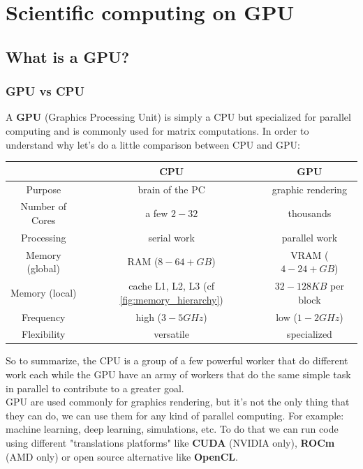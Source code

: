 \documentclass[12pt, openany]{report}
\theoremstyle{definition}
\begin{document}
\chapter{Scientific computing on GPU}
\section{What is a GPU?}
\subsection{GPU vs CPU}
A \textbf{GPU} (Graphics Processing Unit) is simply a CPU but specialized for parallel computing and is commonly used for matrix computations. In order to understand why let's do a little comparison between CPU and GPU:
\begin{center}
	\begin{tabular}{|c|c|c|}
		\hline
		& CPU & GPU \\
		\hline
		Purpose & brain of the PC & graphic rendering \\
		\hline
		Number of Cores & a few $2-32$ & thousands \\
		\hline
		Processing & serial work & parallel work \\
		\hline
		Memory (global) & RAM ($8-64+ GB$) & VRAM ($4-24+ GB$) \\
		\hline
		Memory (local) & cache L1, L2, L3 (cf \ref{fig:memory_hierarchy}) & $32-128 KB$ per block \\
		\hline
		Frequency & high ($3-5 GHz$) & low ($1-2 GHz$) \\
		\hline
		Flexibility & versatile & specialized \\
		\hline
	\end{tabular}
\end{center}
So to summarize, the CPU is a group of a few powerful worker that do different work each while the GPU have an army of workers that do the same simple task in parallel to contribute to a greater goal.\\
GPU are used commonly for graphics rendering, but it's not the only thing that they can do, we can use them for any kind of parallel computing. For example: machine learning, deep learning, simulations, etc. To do that we can run code using different "translations platforms" like \textbf{CUDA} (NVIDIA only), \textbf{ROCm} (AMD only) or open source alternative like \textbf{OpenCL}.\\
\end{document}
